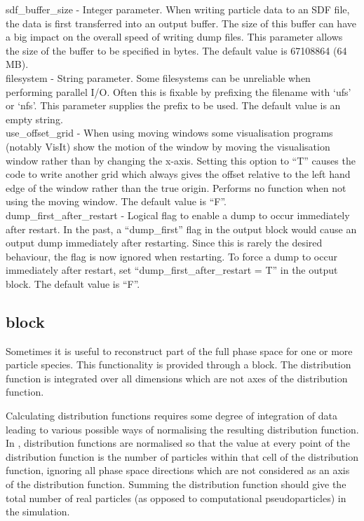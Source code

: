 {\emphtext sdf\_buffer\_size} - Integer parameter. When writing particle data
to an SDF file, the data is first transferred into an output buffer. The
size of this buffer can have a big impact on the overall speed of writing
dump files. This parameter allows the size of the buffer to be specified in
bytes. The default value is 67108864 (64 MB).\\

{\emphtext filesystem} - String parameter. Some filesystems can be unreliable
when performing parallel I/O. Often this is fixable by prefixing the filename
with `ufs' or `nfs'. This parameter supplies the prefix to be used. The
default value is an empty string.\\

{\emphtext use\_offset\_grid} - When using moving windows some visualisation
programs (notably VisIt) show the motion of the window by moving the
visualisation window rather than by changing the x-axis. Setting this option to
``T'' causes the code to write another grid which always gives the offset
relative to the left hand edge of the window rather than the true origin.
Performs no function when not using the moving window. The default value
is ``F''.\\

{\emphtext dump\_first\_after\_restart} - Logical flag to enable a dump to
occur immediately after restart.
In the past, a ``dump\_first'' flag in the output block would cause
an output dump immediately after restarting. Since this is rarely
the desired behaviour, the flag is now ignored when restarting.
To force a dump to occur immediately after restart, set
``dump\_first\_after\_restart = T'' in the output block. The default value
is ``F''.


\subsection{\texorpdfstring
  { block}
  {           {dist\_fn} block}}
\label{sec:dist_fn_block}

Sometimes it is useful to reconstruct part of the
full phase space for one or more particle species.
This functionality is provided through a  block. The
distribution function is integrated over all dimensions which are not axes of
the distribution function.

Calculating distribution functions requires some degree of integration of data
leading to various possible ways of normalising the resulting distribution
function. In {\EPOCH}, distribution functions are normalised so that the value
at every point of the distribution function is the number of particles within
that cell of the distribution function, ignoring all phase space directions
which are not considered as an axis of the distribution function. Summing the
distribution function should give the total number of real particles
(as opposed to computational pseudoparticles) in the
simulation.

